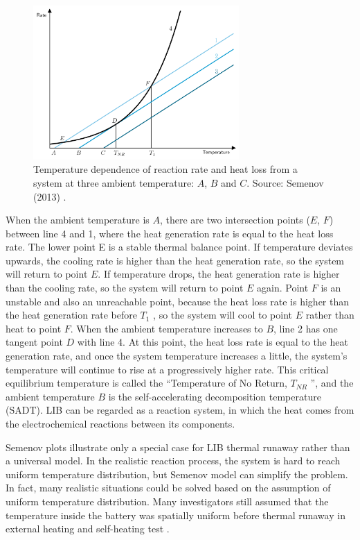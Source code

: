 \begin{figure}[ht]
    \centering
    \includegraphics[width=0.7\textwidth]{Images/Chapter2/semenov-plot.png}
    \caption[Temperature dependence of reaction rate and heat loss]{Temperature dependence of reaction rate and heat loss from a system at three ambient temperature: $A$, $B$ and $C$. Source: Semenov (2013) \cite{semenov2013some}.}
    \label{fig:semenov-plot}
\end{figure}

When the ambient temperature is $A$, there are two intersection points ($E$, $F$) between line 4 and 1, where the heat generation rate is equal to the heat loss rate. The lower point E is a stable thermal balance point. If temperature deviates upwards, the cooling rate is higher than the heat generation rate, so the system will return to point $E$. If temperature drops, the heat generation rate is higher than the cooling rate, so the system will return to point $E$ again. Point $F$ is an unstable and also an unreachable point, because the heat loss rate is higher than the heat generation rate before $T_1$ , so the system will cool to point $E$ rather than heat to point $F$. When the ambient temperature increases to $B$, line 2 has one tangent point $D$ with line 4. At this point, the heat loss rate is equal to the heat generation rate, and once the system temperature increases a little, the system's temperature will continue to rise at a progressively higher rate. This critical equilibrium temperature is called the “Temperature of No Return, $T_{NR}$ ”, and the ambient temperature $B$ is the self-accelerating decomposition temperature (SADT). LIB can be regarded as a reaction system, in which the heat comes from the electrochemical reactions between its components.

Semenov plots illustrate only a special case for LIB thermal runaway rather than a universal model. In the realistic reaction process, the system is hard to reach uniform temperature distribution, but Semenov model can simplify
the problem. In fact, many realistic situations could be solved based on the assumption of uniform temperature distribution. Many investigators still assumed that the temperature inside the battery was spatially uniform before thermal runaway in external heating and self-heating test \cite{liu2015comprehensive,feng2014thermal}.

